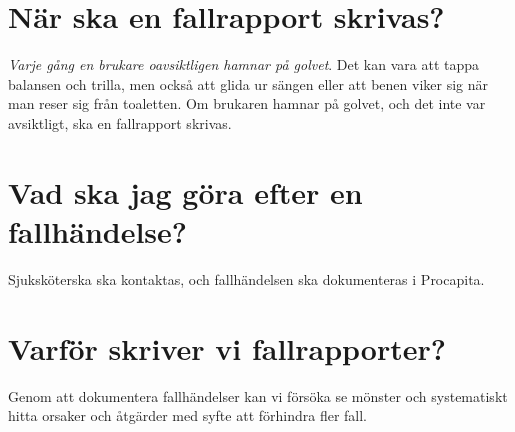 \documentclass[paper=a5,DIV=15,headinclude,twoside=semi,openany,titlepage=firstiscover]{scrbook}
\begin{document}
\begin{titlepage}
\end{titlepage}

\mainmatter
\pagestyle{empty}

\section*{När ska en fallrapport skrivas?}
\textit{Varje gång en brukare oavsiktligen hamnar på golvet}. Det kan vara att tappa balansen och trilla, men också att glida ur sängen eller att benen viker sig när man reser sig från toaletten. Om brukaren hamnar på golvet, och det inte var avsiktligt, ska en fallrapport skrivas.

\section*{Vad ska jag göra efter en fallhändelse?}
Sjuksköterska ska kontaktas, och fallhändelsen ska dokumenteras i Procapita.

\section*{Varför skriver vi fallrapporter?}
Genom att dokumentera fallhändelser kan vi försöka se mönster och systematiskt hitta orsaker och åtgärder med syfte att förhindra fler fall. 

\clearpage
\end{document}
